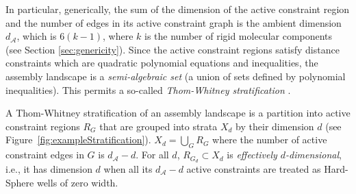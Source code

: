 \documentclass[]{article}
\newcommand{\figref}[1]{Figure~\ref{#1}}
\newcommand{\rmc}{rigid molecular component}
\begin{document}
In particular, generically, the sum of the dimension of the active constraint
region and the number of edges in its active constraint graph is the ambient
dimension $d_\mathcal{A}$, which is $6(k-1)$, where $k$ is the number of \rmc s
(see Section \ref{sec:genericity}).  Since the active constraint regions
satisfy distance constraints which are quadratic polynomial equations and
inequalities, the assembly landscape is a \emph{semi-algebraic set} (a union of
sets defined by polynomial inequalities). This permits a so-called
\emph{Thom-Whitney stratification} \cite{Kuo}.

A Thom-Whitney stratification of an assembly landscape 
is a partition into active constraint regions $R_G$
that are grouped into strata $X_d$ by their dimension $d$ (see
\figref{fig:exampleStratification}). $X_d = \bigcup\limits_G R_G$ where the
number of active constraint edges in $G$ is $d_\mathcal{A} - d$.  For all $d$,
$R_{G_d} \subset X_d$ is \emph{effectively $d$-dimensional}, i.e., it has
dimension $d$ when all its $d_\mathcal{A}-d$ active constraints are treated as
Hard-Sphere wells of zero width.
\end{document}
